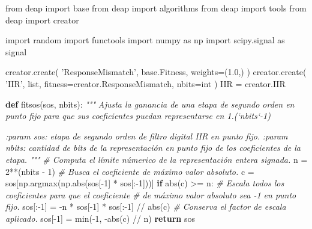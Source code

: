\documentclass[11pt]{article}
\newenvironment{Shaded}{}{}
\newcommand{\KeywordTok}[1]{\textcolor[rgb]{0.00,0.44,0.13}{\textbf{{#1}}}}
\newcommand{\DecValTok}[1]{\textcolor[rgb]{0.25,0.63,0.44}{{#1}}}
\newcommand{\FloatTok}[1]{\textcolor[rgb]{0.25,0.63,0.44}{{#1}}}
\newcommand{\StringTok}[1]{\textcolor[rgb]{0.25,0.44,0.63}{{#1}}}
\newcommand{\CommentTok}[1]{\textcolor[rgb]{0.38,0.63,0.69}{\textit{{#1}}}}
\newcommand{\NormalTok}[1]{{#1}}
\newcommand{\ImportTok}[1]{{#1}}
\newcommand{\ControlFlowTok}[1]{\textcolor[rgb]{0.00,0.44,0.13}{\textbf{{#1}}}}
\newcommand{\OperatorTok}[1]{\textcolor[rgb]{0.40,0.40,0.40}{{#1}}}
\newcommand{\BuiltInTok}[1]{{#1}}
\begin{document}
    \begin{Shaded}
\begin{Highlighting}[]
\ImportTok{from}\NormalTok{ deap }\ImportTok{import}\NormalTok{ base}
\ImportTok{from}\NormalTok{ deap }\ImportTok{import}\NormalTok{ algorithms}
\ImportTok{from}\NormalTok{ deap }\ImportTok{import}\NormalTok{ tools}
\ImportTok{from}\NormalTok{ deap }\ImportTok{import}\NormalTok{ creator}

\ImportTok{import}\NormalTok{ random}
\ImportTok{import}\NormalTok{ functools}
\ImportTok{import}\NormalTok{ numpy }\ImportTok{as}\NormalTok{ np}
\ImportTok{import}\NormalTok{ scipy.signal }\ImportTok{as}\NormalTok{ signal}

\NormalTok{creator.create(}
    \StringTok{'ResponseMismatch'}\NormalTok{, base.Fitness, weights}\OperatorTok{=}\NormalTok{(}\FloatTok{1.0}\NormalTok{,)}
\NormalTok{)}
\NormalTok{creator.create(}
    \StringTok{'IIR'}\NormalTok{, }\BuiltInTok{list}\NormalTok{, fitness}\OperatorTok{=}\NormalTok{creator.ResponseMismatch, nbits}\OperatorTok{=}\BuiltInTok{int}
\NormalTok{)}
\NormalTok{IIR }\OperatorTok{=}\NormalTok{ creator.IIR}


\KeywordTok{def}\NormalTok{ fitsos(sos, nbits):}
    \CommentTok{"""}
\CommentTok{    Ajusta la ganancia de una etapa de segundo orden en punto fijo}
\CommentTok{    para que sus coeficientes puedan representarse en 1.(`nbits`-1)}

\CommentTok{    :param sos: etapa de segundo orden de filtro digital IIR}
\CommentTok{       en punto fijo.}
\CommentTok{    :param nbits: cantidad de bits de la representación en}
\CommentTok{       punto fijo de los coeficientes de la etapa.}
\CommentTok{    """}
    \CommentTok{# Computa el límite númerico de la representación entera signada.}
\NormalTok{    n }\OperatorTok{=} \DecValTok{2}\OperatorTok{**}\NormalTok{(nbits }\OperatorTok{-} \DecValTok{1}\NormalTok{)}
    \CommentTok{# Busca el coeficiente de máximo valor absoluto.}
\NormalTok{    c }\OperatorTok{=}\NormalTok{ sos[np.argmax(np.}\BuiltInTok{abs}\NormalTok{(sos[}\OperatorTok{-}\DecValTok{1}\NormalTok{] }\OperatorTok{*}\NormalTok{ sos[:}\OperatorTok{-}\DecValTok{1}\NormalTok{]))]}
    \ControlFlowTok{if} \BuiltInTok{abs}\NormalTok{(c) }\OperatorTok{>=}\NormalTok{ n:}
        \CommentTok{# Escala todos los coeficientes para que el coeficiente}
        \CommentTok{# de máximo valor absoluto sea -1 en punto fijo.}
\NormalTok{        sos[:}\OperatorTok{-}\DecValTok{1}\NormalTok{] }\OperatorTok{=} \OperatorTok{-}\NormalTok{n }\OperatorTok{*}\NormalTok{ sos[}\OperatorTok{-}\DecValTok{1}\NormalTok{] }\OperatorTok{*}\NormalTok{ sos[:}\OperatorTok{-}\DecValTok{1}\NormalTok{] }\OperatorTok{//} \BuiltInTok{abs}\NormalTok{(c)}
        \CommentTok{# Conserva el factor de escala aplicado.}
\NormalTok{        sos[}\OperatorTok{-}\DecValTok{1}\NormalTok{] }\OperatorTok{=} \BuiltInTok{min}\NormalTok{(}\OperatorTok{-}\DecValTok{1}\NormalTok{, }\OperatorTok{-}\BuiltInTok{abs}\NormalTok{(c) }\OperatorTok{//}\NormalTok{ n)}
    \ControlFlowTok{return}\NormalTok{ sos}



\end{Highlighting}
\end{Shaded}
\end{document}
